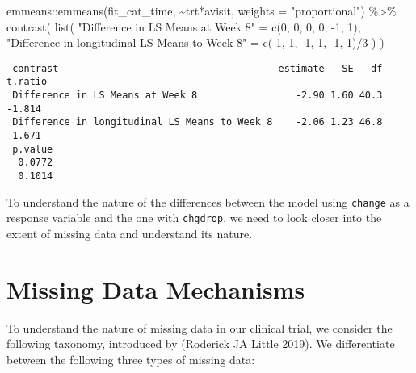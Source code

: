\documentclass[
  letterpaper,
  DIV=11,
  numbers=noendperiod]{scrreprt}
\newenvironment{Shaded}{\begin{snugshade}}{\end{snugshade}}
\newcommand{\AttributeTok}[1]{\textcolor[rgb]{0.40,0.45,0.13}{#1}}
\newcommand{\DecValTok}[1]{\textcolor[rgb]{0.68,0.00,0.00}{#1}}
\newcommand{\FunctionTok}[1]{\textcolor[rgb]{0.28,0.35,0.67}{#1}}
\newcommand{\NormalTok}[1]{\textcolor[rgb]{0.00,0.23,0.31}{#1}}
\newcommand{\OtherTok}[1]{\textcolor[rgb]{0.00,0.23,0.31}{#1}}
\newcommand{\SpecialCharTok}[1]{\textcolor[rgb]{0.37,0.37,0.37}{#1}}
\newcommand{\StringTok}[1]{\textcolor[rgb]{0.13,0.47,0.30}{#1}}
\begin{document}
\begin{Shaded}
\begin{Highlighting}[]
\NormalTok{emmeans}\SpecialCharTok{::}\FunctionTok{emmeans}\NormalTok{(fit\_cat\_time, }\SpecialCharTok{\textasciitilde{}}\NormalTok{trt}\SpecialCharTok{*}\NormalTok{avisit, }\AttributeTok{weights =} \StringTok{"proportional"}\NormalTok{) }\SpecialCharTok{\%\textgreater{}\%} 
  \FunctionTok{contrast}\NormalTok{(}
    \FunctionTok{list}\NormalTok{(}
      \StringTok{"Difference in LS Means at Week 8"} \OtherTok{=} \FunctionTok{c}\NormalTok{(}\DecValTok{0}\NormalTok{, }\DecValTok{0}\NormalTok{, }\DecValTok{0}\NormalTok{, }\DecValTok{0}\NormalTok{, }\SpecialCharTok{{-}}\DecValTok{1}\NormalTok{, }\DecValTok{1}\NormalTok{),}
      \StringTok{"Difference in longitudinal LS Means to Week 8"} \OtherTok{=} \FunctionTok{c}\NormalTok{(}\SpecialCharTok{{-}}\DecValTok{1}\NormalTok{, }\DecValTok{1}\NormalTok{, }\SpecialCharTok{{-}}\DecValTok{1}\NormalTok{, }\DecValTok{1}\NormalTok{, }\SpecialCharTok{{-}}\DecValTok{1}\NormalTok{, }\DecValTok{1}\NormalTok{)}\SpecialCharTok{/}\DecValTok{3}
\NormalTok{    )}
\NormalTok{  )}
\end{Highlighting}
\end{Shaded}

\begin{verbatim}
 contrast                                      estimate   SE   df t.ratio
 Difference in LS Means at Week 8                 -2.90 1.60 40.3  -1.814
 Difference in longitudinal LS Means to Week 8    -2.06 1.23 46.8  -1.671
 p.value
  0.0772
  0.1014
\end{verbatim}

To understand the nature of the differences between the model using
\texttt{change} as a response variable and the one with
\texttt{chgdrop}, we need to look closer into the extent of missing data
and understand its nature.

\hypertarget{missing-data-mechanisms}{%
\section{Missing Data Mechanisms}\label{missing-data-mechanisms}}

To understand the nature of missing data in our clinical trial, we
consider the following taxonomy, introduced by (Roderick JA Little
2019). We differentiate between the following three types of missing
data:
\end{document}
